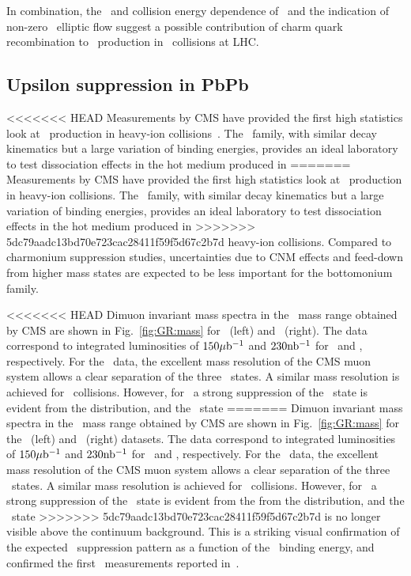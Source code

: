 In combination, the \pT\ and collision energy dependence of \jpsi \Raa\ and the indication of non-zero \jpsi\ elliptic
flow suggest a possible  contribution of charm quark recombination to \jpsi\ production in \PbPb\ collisions
at LHC.

\subsection{Upsilon suppression in PbPb}

<<<<<<< HEAD
Measurements by CMS have provided the first high statistics look at \PgU\ 
production in heavy-ion collisions~\cite{CMS_Y_2010}.
The \PgU\ family, with similar decay kinematics but a large variation of binding energies, 
provides an ideal laboratory to test dissociation effects in the hot medium produced in 
=======
Measurements by CMS have provided the first high statistics look at \PgU\ production in heavy-ion collisions.
The \PgU\ family, with similar decay kinematics but a large variation of binding energies,
provides an ideal laboratory to test dissociation effects in the hot medium produced in
>>>>>>> 5dc79aadc13bd70e723cac28411f59f5d67c2b7d
heavy-ion collisions. Compared to charmonium suppression studies, uncertainties due
to CNM effects and feed-down from higher mass states are expected to be
less important for the bottomonium family.

<<<<<<< HEAD
Dimuon invariant mass spectra in the \PgU\ mass range obtained by CMS are shown in Fig.~\ref{fig:GR:mass} for \PbPb\ (left) 
and \pp\ (right). The data correspond to integrated luminosities of $150\mathrm{\mu b^{-1}}$ and $230 \mathrm{nb^{-1}}$ for 
\PbPb\ and \pp, respectively. For the \pp\ data, the excellent mass resolution of the CMS muon system
allows a clear separation of the three \PgUn\ states. A similar mass resolution is achieved for \PbPb\ collisions. 
However, for \PbPb\ a strong suppression of the \PgUb\ state is evident from the distribution, and the \PgUc\ state 
=======
Dimuon invariant mass spectra in the \PgU\ mass range obtained by CMS are shown in Fig.~\ref{fig:GR:mass} for the \PbPb\ (left)
and \pp\ (right) datasets. The data correspond to integrated luminosities of $150\mathrm{\mu b^{-1}}$ and $230 \mathrm{nb^{-1}}$ for
\PbPb\ and \pp, respectively. For the \pp\ data, the excellent mass resolution of the CMS muon system
allows a clear separation of the three \PgUn\ states. A similar mass resolution is achieved for \PbPb\ collisions.
However, for \PbPb\ a strong suppression of the \PgUb\ state is evident from the from the distribution, and the \PgUc\ state
>>>>>>> 5dc79aadc13bd70e723cac28411f59f5d67c2b7d
is no longer visible above the continuum background. This is a striking visual confirmation of the expected
\PgU\ suppression pattern as a function of the \PgUn\ binding energy, and confirmed the first \PgU\ measurements
reported in~\cite{CMS_Y_2010}.

